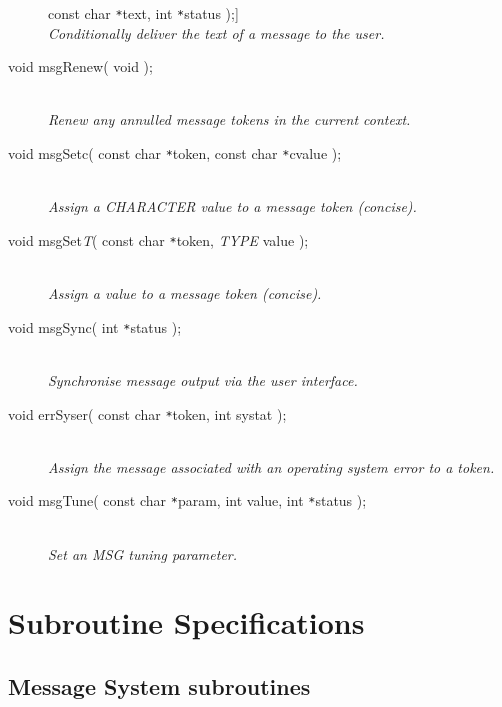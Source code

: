 \documentclass[twoside,11pt]{starlink}
\providecommand{\listline}{\hspace{1pt}\\}
\begin{document}
\begin{description}
const char \texttt{*}text, int \texttt{*}status );] \listline
\textit{Conditionally deliver the text of a message to the user.}
\item[void msgRenew( void );] \listline
\textit{Renew any annulled message tokens in the current context.}
\item[void msgSetc( const char \texttt{*}token,
const char \texttt{*}cvalue );] \listline
\textit{Assign a CHARACTER value to a message token (concise).}
\item[void msgSet\textit{T}( const char \texttt{*}token,
\textit{TYPE} value );] \listline
\textit{Assign a value to a message token (concise).}
\item[void msgSync( int \texttt{*}status );] \listline
\textit{Synchronise message output via the user interface.}
\item[void errSyser( const char \texttt{*}token, int systat );] \listline
\textit{Assign the message associated with an operating system error to a
token.}
\item[void msgTune( const char \texttt{*}param, int value,
int \texttt{*}status );] \listline
\textit{Set an MSG tuning parameter.}
\end{description}

\newpage
\section{Subroutine Specifications \label{specs_sect}}
\subsection{Message System subroutines}
\end{document}
